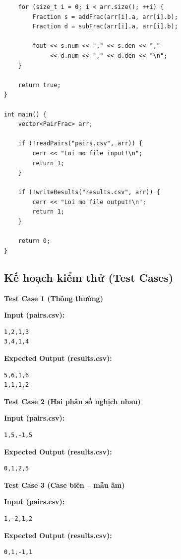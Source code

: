 \begin{lstlisting}
    for (size_t i = 0; i < arr.size(); ++i) {
        Fraction s = addFrac(arr[i].a, arr[i].b);
        Fraction d = subFrac(arr[i].a, arr[i].b);

        fout << s.num << "," << s.den << ","
             << d.num << "," << d.den << "\n";
    }

    return true;
}

int main() {
    vector<PairFrac> arr;

    if (!readPairs("pairs.csv", arr)) {
        cerr << "Loi mo file input!\n";
        return 1;
    }

    if (!writeResults("results.csv", arr)) {
        cerr << "Loi mo file output!\n";
        return 1;
    }

    return 0;
}
\end{lstlisting}

\subsection{Kế hoạch kiểm thử (Test Cases)}

\textbf{Test Case 1 (Thông thường)}

\textbf{Input (pairs.csv):}
\begin{lstlisting}
1,2,1,3
3,4,1,4
\end{lstlisting}

\textbf{Expected Output (results.csv):}
\begin{lstlisting}
5,6,1,6
1,1,1,2
\end{lstlisting}

\vspace{0.5cm}

\textbf{Test Case 2 (Hai phân số nghịch nhau)}

\textbf{Input (pairs.csv):}
\begin{lstlisting}
1,5,-1,5
\end{lstlisting}

\textbf{Expected Output (results.csv):}
\begin{lstlisting}
0,1,2,5
\end{lstlisting}

\vspace{0.5cm}

\textbf{Test Case 3 (Case biên -- mẫu âm)}

\textbf{Input (pairs.csv):}
\begin{lstlisting}
1,-2,1,2
\end{lstlisting}

\textbf{Expected Output (results.csv):}
\begin{lstlisting}
0,1,-1,1
\end{lstlisting}
